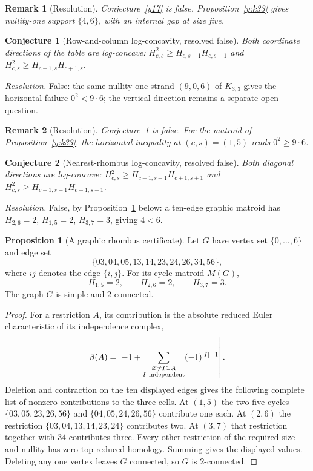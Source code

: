 \documentclass[11pt]{article}
\newtheorem{conjecture}{Conjecture}
\newtheorem{remark}{Remark}
\theoremstyle{definition}
\newtheorem{proposition}{Proposition}
\begin{document}
\begin{remark}[Resolution]\label{y17:res}
Conjecture~\ref{y17} is false.  Proposition~\ref{y:k33} gives nullity-one support $\{4,6\}$, with an internal gap at size five.
\end{remark}

\begin{conjecture}[Row-and-column log-concavity, resolved false]\label{y18}
Both coordinate directions of the table are log-concave: $H_{c,s}^2\ge H_{c,s-1}H_{c,s+1}$ and $H_{c,s}^2\ge H_{c-1,s}H_{c+1,s}$.
\end{conjecture}

\emph{Resolution.} False: the same nullity-one strand $(9,0,6)$ of $K_{3,3}$ gives the horizontal failure $0^2<9\cdot6$; the vertical direction remains a separate open question.

\begin{remark}[Resolution]\label{y18:res}
Conjecture~\ref{y18} is false.  For the matroid of Proposition~\ref{y:k33}, the horizontal inequality at $(c,s)=(1,5)$ reads $0^2\ge9\cdot6$.
\end{remark}

\begin{conjecture}[Nearest-rhombus log-concavity, resolved false]\label{y19}
Both diagonal directions are log-concave: $H_{c,s}^2\ge H_{c-1,s-1}H_{c+1,s+1}$ and $H_{c,s}^2\ge H_{c-1,s+1}H_{c+1,s-1}$.
\end{conjecture}

\emph{Resolution.} False, by Proposition~\ref{y:rhombus} below: a ten-edge graphic matroid has $H_{2,6}=2$, $H_{1,5}=2$, $H_{3,7}=3$, giving $4<6$.

\begin{proposition}[A graphic rhombus certificate]\label{y:rhombus}
Let $G$ have vertex set $\{0,\ldots,6\}$ and edge set
\[
\{03,04,05,13,14,23,24,26,34,56\},
\]
where $ij$ denotes the edge $\{i,j\}$.  For its cycle matroid $M(G)$,
\[
H_{1,5}=2,\qquad H_{2,6}=2,\qquad H_{3,7}=3.
\]
The graph $G$ is simple and $2$-connected.
\end{proposition}

\begin{proof}
For a restriction $A$, its contribution is the absolute reduced Euler characteristic of its independence complex,
\[
\beta(A)=\left|-1+\sum_{\substack{\varnothing\ne I\subseteq A\\I\ {\rm independent}}}(-1)^{|I|-1}\right|.
\]
Deletion and contraction on the ten displayed edges gives the following complete list of nonzero contributions to the three cells.  At $(1,5)$ the two five-cycles $\{03,05,23,26,56\}$ and $\{04,05,24,26,56\}$ contribute one each.  At $(2,6)$ the restriction $\{03,04,13,14,23,24\}$ contributes two.  At $(3,7)$ that restriction together with $34$ contributes three.  Every other restriction of the required size and nullity has zero top reduced homology.  Summing gives the displayed values.  Deleting any one vertex leaves $G$ connected, so $G$ is $2$-connected.
\end{proof}
\end{document}

